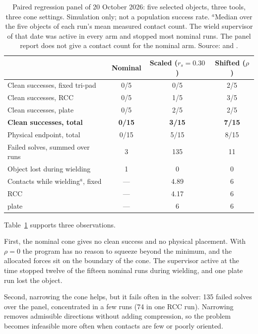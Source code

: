\begin{table}[htbp]\centering\small
\begin{tabular}{@{}lccc@{}}\toprule
& Nominal & Scaled ($r_s=0.30$) & Shifted ($\rho$)\\\midrule
Clean successes, fixed tri-pad & 0/5 & 0/5 & 2/5\\
Clean successes, RCC & 0/5 & 1/5 & 3/5\\
Clean successes, plate & 0/5 & 2/5 & 2/5\\
\textbf{Clean successes, total} & \textbf{0/15} & \textbf{3/15} & \textbf{7/15}\\
Physical endpoint, total & 0/15 & 5/15 & 8/15\\
Failed solves, summed over runs & 3 & 135 & 11\\
Object lost during wielding & 1 & 0 & 0\\
Contacts while wielding$^{a}$, fixed & --- & 4.89 & 6\\
\quad RCC & --- & 4.17 & 6\\
\quad plate & --- & 6 & 6\\
\bottomrule\end{tabular}
\caption{Paired regression panel of 20 October 2026: five selected objects, three tools, three cone settings. Simulation only; not a population success rate. $^{a}$Median over the five objects of each run's mean measured contact count. The wield supervisor of that date was active in every arm and stopped most nominal runs. The panel report does not give a contact count for the nominal arm. Source:  and .}
\label{tab:margin-comparison}
\end{table}

Table~\ref{tab:margin-comparison} supports three observations.

First, the nominal cone gives no clean success and no physical placement. With $\rho=0$ the program has no reason to squeeze beyond the minimum, and the allocated forces sit on the boundary of the cone. The supervisor active at the time stopped twelve of the fifteen nominal runs during wielding, and one plate run lost the object.

Second, narrowing the cone helps, but it fails often in the solver: 135 failed solves over the panel, concentrated in a few runs (74 in one RCC run). Narrowing removes admissible directions without adding compression, so the problem becomes infeasible more often when contacts are few or poorly oriented.

